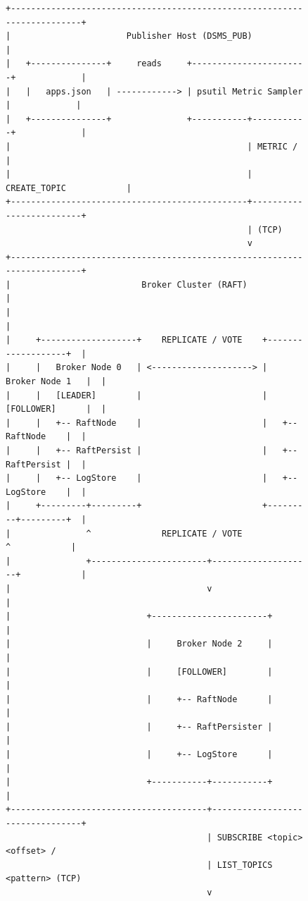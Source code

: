\documentclass[11pt,a4paper]{article}
\begin{document}
\begin{figure}[H]
\centering
\begin{verbatim}
+-------------------------------------------------------------------------+
|                       Publisher Host (DSMS_PUB)                         |
|   +---------------+     reads     +-----------------------+             |
|   |   apps.json   | ------------> | psutil Metric Sampler |             |
|   +---------------+               +-----------+-----------+             |
|                                               | METRIC /                |
|                                               | CREATE_TOPIC            |
+-----------------------------------------------+-------------------------+
                                                | (TCP)
                                                v
+-------------------------------------------------------------------------+
|                          Broker Cluster (RAFT)                          |
|                                                                         |
|     +-------------------+    REPLICATE / VOTE    +-------------------+  |
|     |   Broker Node 0   | <--------------------> |   Broker Node 1   |  |
|     |   [LEADER]        |                        |   [FOLLOWER]      |  |
|     |   +-- RaftNode    |                        |   +-- RaftNode    |  |
|     |   +-- RaftPersist |                        |   +-- RaftPersist |  |
|     |   +-- LogStore    |                        |   +-- LogStore    |  |
|     +---------+---------+                        +---------+---------+  |
|               ^              REPLICATE / VOTE              ^            |
|               +-----------------------+--------------------+            |
|                                       v                                 |
|                           +-----------------------+                     |
|                           |     Broker Node 2     |                     |
|                           |     [FOLLOWER]        |                     |
|                           |     +-- RaftNode      |                     |
|                           |     +-- RaftPersister |                     |
|                           |     +-- LogStore      |                     |
|                           +-----------+-----------+                     |
+---------------------------------------+---------------------------------+
                                        | SUBSCRIBE <topic> <offset> /
                                        | LIST_TOPICS <pattern> (TCP)
                                        v

\end{verbatim}
\end{figure}
\end{document}
